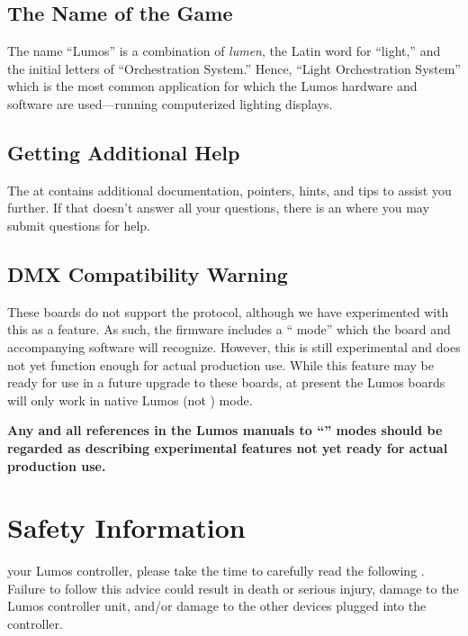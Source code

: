 \documentclass[letterpaper,twoside,onecolumn,openright,final]{memoir}
\begin{document}
\section{The Name of the Game}
The name ``Lumos'' is a combination of \emph{lumen}, the Latin word for ``light,''
and the initial letters of ``Orchestration System.''  Hence, ``Light Orchestration System''
which is the most common application for which the Lumos hardware and software are used---running
computerized lighting displays.

\section{Getting Additional Help}
The  at  contains additional documentation,
pointers, hints, and tips to assist you further.  If that doesn't answer all your questions,
there is an  where you may submit questions for help.

\section{DMX Compatibility Warning}
These boards do not support the  protocol, although we have experimented with
this as a feature.  As such, the firmware includes a `` mode'' which the board
and accompanying software will recognize.  However, this is still experimental and does not yet
function enough for actual production use.  While this feature may be ready for use in a future
upgrade to these boards, at present the Lumos boards will only work in native Lumos (not )
mode.

{\bfseries Any and all references in the Lumos manuals to ``'' modes should
be regarded as describing experimental features not yet ready for actual production use.}

\chapter{Safety Information}\label{ch:safety}

 your Lumos controller, please take the time to
carefully read the following .  Failure to follow this advice could
result in death or serious injury, damage to the Lumos controller unit, and/or damage
to the other devices plugged into the controller.
\end{document}
